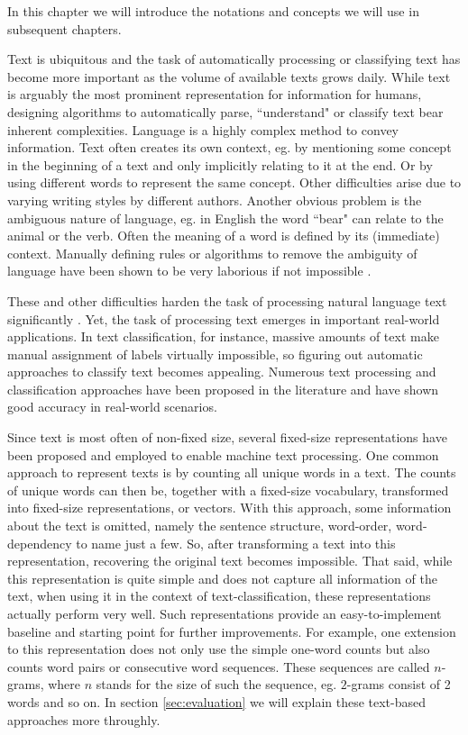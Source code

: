 In this chapter we will introduce the notations and concepts we will use in subsequent chapters.


Text is ubiquitous and the task of automatically processing or classifying text has become more important as the volume of available texts grows daily.
While text is arguably the most prominent representation for information for humans, designing algorithms to automatically parse, ``understand" or classify text bear inherent complexities.
Language is a highly complex method to convey information. 
Text often creates its own context, eg. by mentioning some concept in the beginning of a text and only implicitly relating to it at the end. Or by using different words to represent the same concept.
Other difficulties arise due to varying writing styles by different authors.
Another obvious problem is the ambiguous nature of language\cite{Britton1978}, eg. in English the word ``bear" can relate to the animal or the verb.
Often the meaning of a word is defined by its (immediate) context.
Manually defining rules or algorithms to remove the ambiguity of language have been shown to be very laborious if not impossible \cite[p.~11]{Weikum2002}.

These and other difficulties harden the task of processing natural language text significantly \cite{Chowdhury2003,Weikum2002}.
Yet, the task of processing text emerges in important real-world applications.
In text classification, for instance, massive amounts of text make manual assignment of labels virtually impossible, so figuring out automatic approaches to classify text becomes appealing.
Numerous text processing and classification approaches have been proposed in the literature and have shown good accuracy in real-world scenarios.

Since text is most often of non-fixed size, several fixed-size representations have been proposed and employed to enable machine text processing.
One common approach to represent texts is by counting all unique words in a text. The counts of unique words can then be, together with a fixed-size vocabulary, transformed into fixed-size representations, or vectors.
With this approach, some information about the text is omitted, namely the sentence structure, word-order, word-dependency to name just a few. 
So, after transforming a text into this representation, recovering the original text becomes impossible.
That said, while this representation is quite simple and does not capture all information of the text, when using it in the context of text-classification, these representations actually perform very well.
Such representations provide an easy-to-implement baseline and starting point for further improvements.
For example, one extension to this representation does not only use the simple one-word counts but also counts word pairs or consecutive word sequences. These sequences are called $n$-grams, where $n$ stands for the size of such the sequence, eg. $2$-grams consist of 2 words and so on.
In section \ref{sec:evaluation} we will explain these text-based approaches more throughly.

